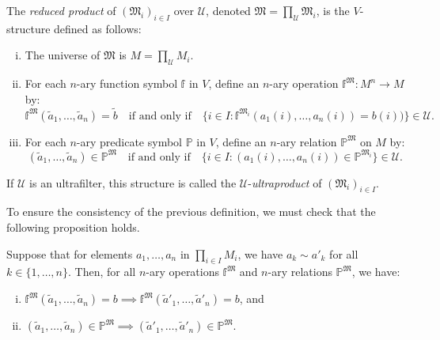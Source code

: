 \documentclass{scrartcl}
\newcommand{\FM}{\mathfrak{M}}
\newcommand{\SU}{\mathscr{U}}
\begin{document}
\begin{definition}
The \emph{reduced product} of $(\FM_i)_{i\in I}$ over $\mathscr{U}$, denoted $\FM = \prod_\mathscr{U}\FM_i$, is the $V$-structure defined as follows:

\begin{enumerate}[i)]

\item The universe of $\FM$ is $M = \prod_\mathscr{U}M_i$.

\item
For each $n$-ary function symbol $\mathbb{f}$ in $V$, define an $n$-ary operation $\mathbb{f}^\FM \colon M^n\to M$ by:
\[
\mathbb{f}^\mathscr{\mathfrak{M}}(\tilde{a}_1, \dots, \tilde{a}_n)=\tilde{b}
\quad\text{if and only if}\quad
\{i\in I \colon \mathbb{f}^{\FM_i}(a_1(i), \dots, a_n(i))=b(i))\}\in \mathscr{U}.
\]

\item For each $n$-ary predicate symbol $\mathbb{P}$ in $V$, define an $n$-ary relation $\mathbb{P}^\FM$ on $M$ by:
\[
(\tilde{a}_1, \dots, \tilde{a}_n) \in \mathbb{P}^{\FM}
\quad\text{if and only if}\quad
\{i \in I\colon 
(a_1(i), \dots, a_n(i)) \in \mathbb{P}^{\FM_i}
\}\in \SU.
\]

\end{enumerate}

If $\SU$ is an ultrafilter, this structure is called the $\SU$-\emph{ultraproduct} of $(\FM_i)_{i\in I}$.

\end{definition}


To ensure the consistency of the previous definition, we must check that the following proposition holds.

\begin{proposition}

Suppose that for elements $a_1,\dots,a_n$ in $\prod_{i\in I} M_i$, we have $a_k \sim a'_k$ for all $k\in\{1,\dots,n\}$. Then, for all $n$-ary operations $\mathbb{f}^\FM$ and $n$-ary relations $\mathbb{P}^\FM$, we have:

\begin{enumerate}[i)]

\item $\mathbb{f}^\FM(\tilde{a}_1,\dots,\tilde{a}_n) = b \implies \mathbb{f}^\FM(\tilde{a}'_1,\dots,\tilde{a}'_n) = b$, \quad and

\item $(\tilde{a}_1,\dots,\tilde{a}_n) \in \mathbb{P}^\FM \implies (\tilde{a}'_1,\dots,\tilde{a}'_n) \in \mathbb{P}^\FM$.
\end{enumerate}

\end{proposition}
\end{document}
